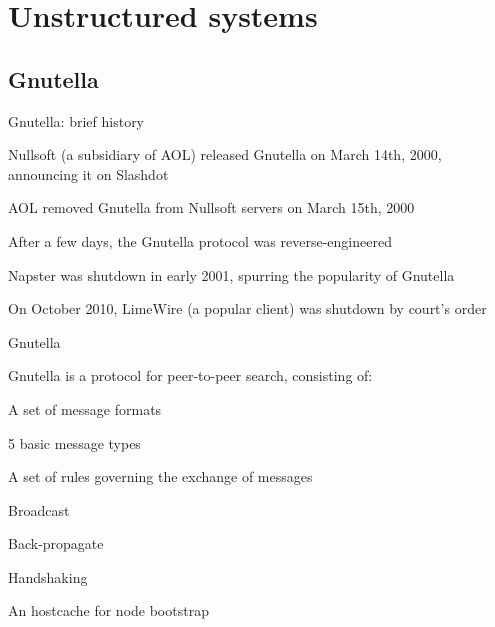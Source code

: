 % 
% 
% 
% 
%  
% 
% 
% 


\section{Unstructured systems}

\subsection{Gnutella}

\begin{frame}{Gnutella: brief history}
	
\BIL
\item Nullsoft (a subsidiary of AOL) released Gnutella on March 14th, 2000,
  announcing it on Slashdot
\item AOL removed Gnutella from Nullsoft servers on March 15th, 2000
\item After a few days, the Gnutella protocol was reverse-engineered
\item Napster was shutdown in early 2001, spurring the popularity of Gnutella
\item On October 2010, LimeWire (a popular client) was shutdown by court's order
\EIL

\end{frame}


\begin{frame}{Gnutella}
	
Gnutella is a protocol for peer-to-peer \alert{search}, consisting of:\\
\BIL
\item A set of message formats 
	\BI
	\item 5 basic message types
	\EI
\item A set of rules governing the exchange of messages
	\BI
	\item Broadcast
	\item Back-propagate
	\item Handshaking
	\EI
\item An \alert{hostcache} for node bootstrap
\EIL

\end{frame}


